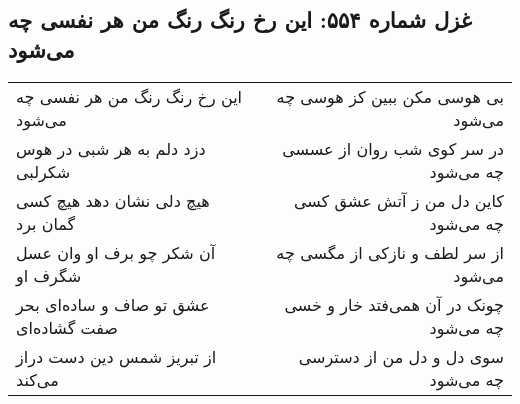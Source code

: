 \begin{center}
\section*{غزل شماره ۵۵۴: این رخ رنگ رنگ من هر نفسی چه می‌شود}
\label{sec:0554}
\begin{longtable}{l p{0.5cm} r}
این رخ رنگ رنگ من هر نفسی چه می‌شود
&&
بی هوسی مکن ببین کز هوسی چه می‌شود
\\
دزد دلم به هر شبی در هوس شکرلبی
&&
در سر کوی شب روان از عسسی چه می‌شود
\\
هیچ دلی نشان دهد هیچ کسی گمان برد
&&
کاین دل من ز آتش عشق کسی چه می‌شود
\\
آن شکر چو برف او وان عسل شگرف او
&&
از سر لطف و نازکی از مگسی چه می‌شود
\\
عشق تو صاف و ساده‌ای بحر صفت گشاده‌ای
&&
چونک در آن همی‌فتد خار و خسی چه می‌شود
\\
از تبریز شمس دین دست دراز می‌کند
&&
سوی دل و دل من از دسترسی چه می‌شود
\\
\end{longtable}
\end{center}
